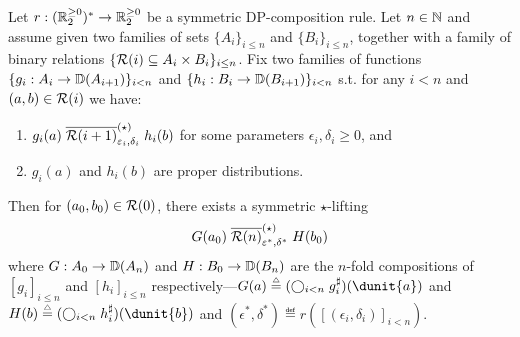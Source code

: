 \documentclass{lmcs}
\begin{document}
\begin{lem} \label{l:symstar:comp}
  Let $r : (\mathbb{R}^{\geq 0}_2)^* \to \mathbb{R}^{\geq 0}_2$ be a symmetric DP-composition
  rule. Let $n \in \mathbb{N}$ and assume given two families of sets $\{A_i\}_{i
  \leq n}$ and $\{B_i\}_{i \leq n}$, together with a family of binary relations
  $\{ \mathcal{R}(i) \subseteq A_i \times B_i \}_{i \leq n}$.
  Fix two families of functions
  $\{ g_i : A_i \to {\mathbb{D}}(A_{i+1}) \}_{i < n}$ and
  $\{ h_i : B_i \to {\mathbb{D}}(B_{i+1}) \}_{i < n}$ s.t.
  for any $i < n$ and $(a, b) \in \mathcal{R}(i)$ we have:
  \begin{enumerate}
  \item
    $g_i(a) \mathrel{\mathrel{\overline{\mathcal{R}(i + 1)}^{(\star)}_{\varepsilon_i, \delta_i}}}
    h_i(b)$ for some parameters $\epsilon_i, \delta_i \geq 0$, and
  \item
    $g_i(a)$ and $h_i(b)$ are proper distributions.
  \end{enumerate}
  Then for $(a_0, b_0) \in \mathcal{R}(0)$, there exists a symmetric $\star$-lifting
  \[
    G(a_0) \mathrel{\mathrel{\overline{\mathcal{R}(n)}^{(\star)}_{\varepsilon^*, \delta^*}}} H(b_0) 
  \]
  where $G : A_0 \to {\mathbb{D}}(A_n)$ and $H : B_0 \to {\mathbb{D}}(B_n)$ are the $n$-fold
  compositions of $[ g_i ]_{i \leq n}$ and $[ h_i ]_{i \leq n}$
  respectively---\ie $G(a) \eqdef (\bigcirc_{i < n} \lift{g_i})(\dunit{a})$ and
  $H(b) \eqdef (\bigcirc_{i < n} \lift{h_i})(\dunit{b})$ and $(\epsilon^*,
  \delta^*) \eqdef r([(\epsilon_i, \delta_i)]_{i < n})$.
\end{lem}
\end{document}
